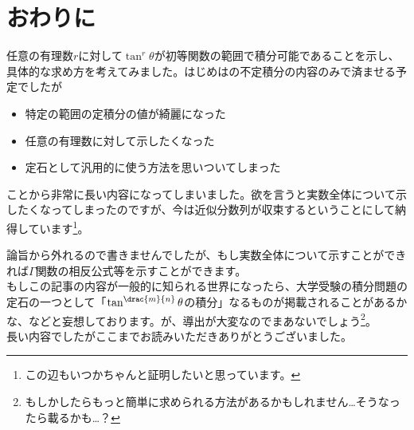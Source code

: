 \documentclass[a4j,uplatex,dvipdfmx,10pt]{jsarticle}
\begin{document}
\section{おわりに}
\label{sec:おわりに}
任意の有理数\(r \)に対して\(\tan ^r \theta  \)が初等関数の範囲で積分可能であることを示し、具体的な求め方を考えてみました。はじめはの不定積分の内容のみで済ませる予定でしたが
\begin{itemize}
	\item 特定の範囲の定積分の値が綺麗になった
	\item 任意の有理数に対して示したくなった
	\item 定石として汎用的に使う方法を思いついてしまった
\end{itemize}
ことから非常に長い内容になってしまいました。欲を言うと実数全体について示したくなってしまったのですが、今は近似分数列が収束するということにして納得しています\footnote{この辺もいつかちゃんと証明したいと思っています。\label{fot:2022-09-16_12-00-22}}。

論旨から外れるので書きませんでしたが、もし実数全体について示すことができれば\(\Gamma  \)関数の相反公式等を示すことができます。\\

もしこの記事の内容が一般的に知られる世界になったら、大学受験の積分問題の定石の一つとして「\(\tan ^{\drac{m}{n}}\theta  \)の積分」なるものが掲載されることがあるかな、などと妄想しております。が、導出が大変なのでまあないでしょう\footnote{もしかしたらもっと簡単に求められる方法があるかもしれません…そうなったら載るかも…？\label{fot:2022-09-15_21-46-36}}。\\

長い内容でしたがここまでお読みいただきありがとうございました。
\end{document}
